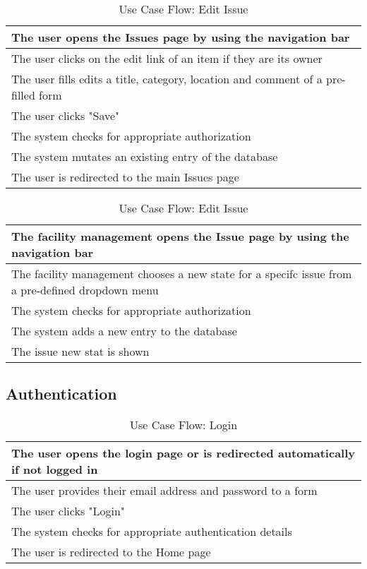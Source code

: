   \begin{table}[H]
    \begin{tabularx}{\linewidth}{|X|}
      \hline
       The user opens the Issues page by using the navigation bar \\
       \hline
       The user clicks on the edit link of an item if they are its owner \\
       \hline
       The user fills edits a title, category, location and comment of a pre-filled form  \\
       \hline
       The user clicks "Save" \\
       \hline
       The system checks for appropriate authorization \\
       \hline
       The system mutates an existing entry of the database \\
       \hline
       The user is redirected to the main Issues page \\
       \hline 
    \end{tabularx}
    \caption{Use Case Flow: Edit Issue}
  \end{table}

  \begin{table}[H]
    \begin{tabularx}{\linewidth}{|X|}
      \hline
       The facility management opens the Issue page by using the navigation bar \\
       \hline
       The facility management chooses a new state for a specifc issue from a pre-defined dropdown menu \\
       \hline
       The system checks for appropriate authorization \\
       \hline
       The system adds a new entry to the database \\
       \hline
       The issue new stat is shown \\
       \hline 
    \end{tabularx}
    \caption{Use Case Flow: Edit Issue}
  \end{table}

\subsection{Authentication} \label{usecases:authentication}
\begin{table}[H]
  \begin{tabularx}{\linewidth}{|X|}
    \hline
     The user opens the login page or is redirected automatically if not logged in \\
     \hline
     The user provides their email address and password to a form \\
     \hline
     The user clicks "Login" \\
     \hline
     The system checks for appropriate authentication details \\
     \hline
     The user is redirected to the Home page \\
     \hline 
  \end{tabularx}
  \caption{Use Case Flow: Login}
  \label{usecase:login}
\end{table}

